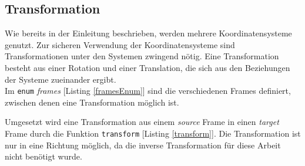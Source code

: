 \subsection{Transformation}
\label{sec_transformations}
Wie bereits in der Einleitung beschrieben, werden mehrere Koordinatensysteme genutzt. Zur sicheren Verwendung der Koordinatensysteme sind Transformationen unter den Systemen zwingend nötig.
Eine Transformation besteht aus einer Rotation und einer Translation, die sich aus den Beziehungen der Systeme zueinander ergibt.\\
Im \texttt{enum} \textit{frames} [Listing \ref{framesEnum}] sind die verschiedenen Frames definiert, zwischen denen eine Transformation möglich ist.



Umgesetzt wird eine Transformation aus einem \textit{source} Frame in einen \textit{target} Frame durch die Funktion \texttt{transform} [Listing \ref{transform}]. Die Transformation ist nur in eine Richtung möglich, da die inverse Transformation für diese Arbeit nicht benötigt wurde.



